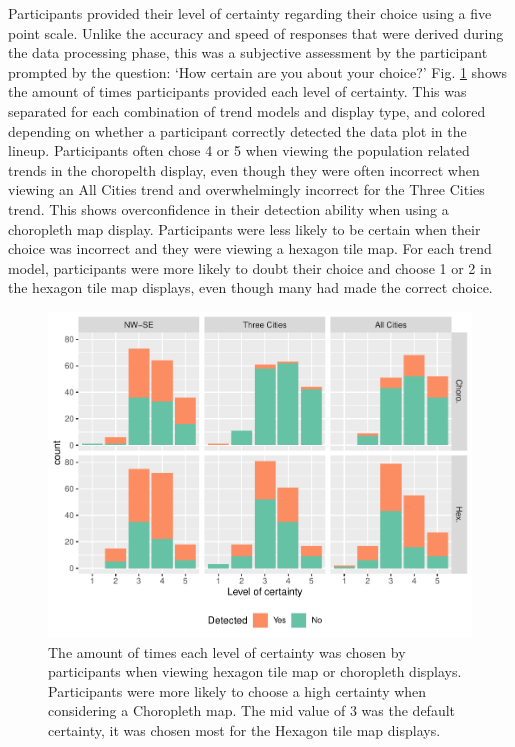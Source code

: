 \documentclass[conference,final,]{IEEEtran}
\begin{document}
Participants provided their level of certainty regarding their choice using a five point scale.
Unlike the accuracy and speed of responses that were derived during the data processing phase, this was a subjective
assessment by the participant prompted by the question: `How certain are you about your choice?'
Fig. \ref{fig:certainty} shows the amount of times participants provided each level of certainty. This was separated for each combination of trend models and display type, and colored depending on whether a participant correctly detected the data plot in the lineup.
Participants often chose 4 or 5 when viewing the population related trends in the choropelth display, even though they were often incorrect when viewing an All Cities trend and overwhelmingly incorrect for the Three Cities trend. This shows overconfidence in their detection ability when using a choropleth map display. Participants were less likely to be certain when their choice was incorrect and they were viewing a hexagon tile map.
For each trend model, participants were more likely to doubt their choice and choose 1 or 2 in the hexagon tile map displays, even though many had made the correct choice.

\begin{figure}
\includegraphics[width=1\linewidth]{paper_files/figure-latex/certainty-1} \caption{The amount of times each level of certainty was chosen by participants when viewing hexagon tile map or choropleth displays. Participants were more likely to choose a high certainty when considering a Choropleth map. The mid value of 3 was the default certainty, it was chosen most for the Hexagon tile map displays.}\label{fig:certainty}
\end{figure}
\end{document}
